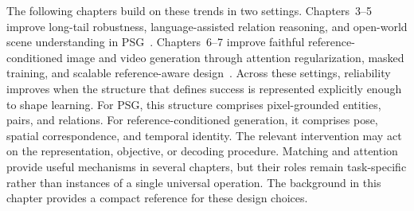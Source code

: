 The following chapters build on these trends in two settings. Chapters~3--5 improve long-tail robustness, language-assisted relation reasoning, and open-world scene understanding in PSG~\citep{yang2022panoptic, zhou2025openpsg}. Chapters~6--7 improve faithful reference-conditioned image and video generation through attention regularization, masked training, and scalable reference-aware design~\citep{zhou2025learning, zhou2025scaling}. Across these settings, reliability improves when the structure that defines success is represented explicitly enough to shape learning. For PSG, this structure comprises pixel-grounded entities, pairs, and relations. For reference-conditioned generation, it comprises pose, spatial correspondence, and temporal identity. The relevant intervention may act on the representation, objective, or decoding procedure. Matching and attention provide useful mechanisms in several chapters, but their roles remain task-specific rather than instances of a single universal operation. The background in this chapter provides a compact reference for these design choices.
